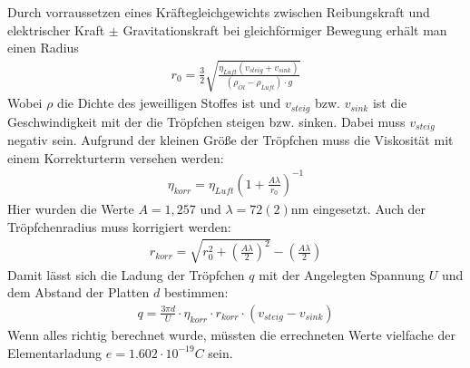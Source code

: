 \documentclass[11pt, a4paper]{article}
\begin{document}
    Durch vorraussetzen eines Kräftegleichgewichts zwischen Reibungskraft und elektrischer Kraft $\pm$ Gravitationskraft bei gleichförmiger Bewegung erhält man einen Radius
    \begin{align}
        r_0 = \frac{3}{2} \sqrt{\frac{\eta_{Luft} (v_{steig} + v_{sink})}{(\rho_{\ddot{Ol}} - \rho_{Luft}) \cdot g}}%
    \end{align}
    Wobei $\rho$ die Dichte des jeweilligen Stoffes ist und $v_{steig}$ bzw. $v_{sink}$ ist die Geschwindigkeit mit der die Tröpfchen steigen bzw. sinken. Dabei muss $v_{steig}$ negativ sein. Aufgrund der kleinen Größe der Tröpfchen muss die Viskosität mit einem Korrekturterm versehen werden:
    \begin{align}
        \eta_{korr} = \eta_{Luft}\left(1+\frac{A \lambda}{r_0}\right)^{-1}
    \end{align}
    Hier wurden die Werte $A = 1,257$ und $\lambda = 72(2) \si{\nano\metre}$ eingesetzt.
    Auch der Tröpfchenradius muss korrigiert werden:
    \begin{align}
        r_{korr} = \sqrt{r_0^2 + \left(\frac{A \lambda}{2}\right)^2} - \left(\frac{A \lambda}{2}\right)
    \end{align}
    Damit lässt sich die Ladung der Tröpfchen $q$ mit der Angelegten Spannung $U$ und dem Abstand der Platten $d$ bestimmen:
    \begin{align}
        q = \frac{3 \pi d}{U} \cdot \eta_{korr} \cdot r_{korr} \cdot \left(v_{steig} - v_{sink}\right)
    \end{align}
    Wenn alles richtig berechnet wurde, müssten die errechneten Werte vielfache der Elementarladung $e = 1.602 \cdot 10^{-19} \si{C}$ sein.
\end{document}
